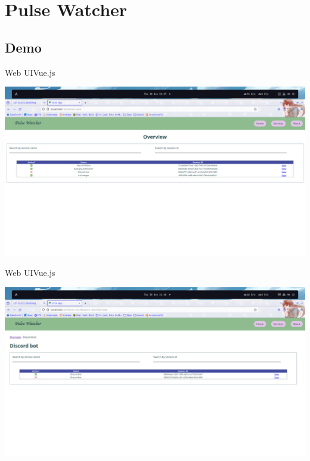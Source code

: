 \documentclass{beamer}
\begin{document}
\section{Pulse Watcher}

\subsection{Demo}

\begin{frame}{Web UI}{Vue.js}

\includegraphics[width=\linewidth,keepaspectratio]{web_ui_1.png}

\end{frame}


\begin{frame}{Web UI}{Vue.js}

\includegraphics[width=\linewidth,keepaspectratio]{web_ui_2.png}

\end{frame}
\end{document}
